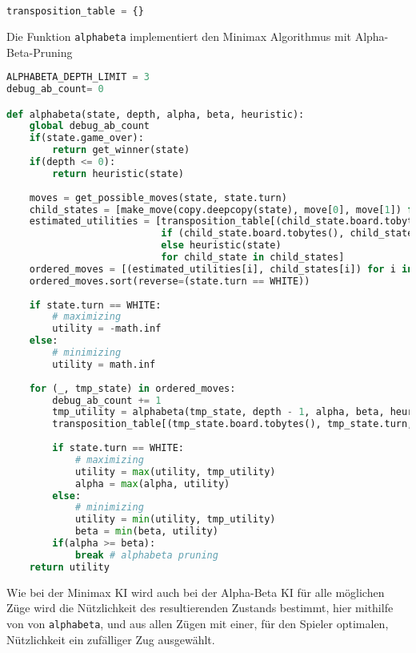 \begin{lstlisting}[language=Python]
transposition_table = {}
\end{lstlisting}

Die Funktion \passthrough{\lstinline!alphabeta!} implementiert den
Minimax Algorithmus mit Alpha-Beta-Pruning

\begin{lstlisting}[language=Python]
ALPHABETA_DEPTH_LIMIT = 3
debug_ab_count= 0

def alphabeta(state, depth, alpha, beta, heuristic):
    global debug_ab_count
    if(state.game_over):
        return get_winner(state)
    if(depth <= 0):
        return heuristic(state)
    
    moves = get_possible_moves(state, state.turn)
    child_states = [make_move(copy.deepcopy(state), move[0], move[1]) for move in moves]
    estimated_utilities = [transposition_table[(child_state.board.tobytes(), child_state.turn, heuristic)]
                           if (child_state.board.tobytes(), child_state.turn, heuristic) in transposition_table
                           else heuristic(state)
                           for child_state in child_states]
    ordered_moves = [(estimated_utilities[i], child_states[i]) for i in range(len(moves))]
    ordered_moves.sort(reverse=(state.turn == WHITE))
    
    if state.turn == WHITE:
        # maximizing
        utility = -math.inf
    else:
        # minimizing
        utility = math.inf
        
    for (_, tmp_state) in ordered_moves:
        debug_ab_count += 1
        tmp_utility = alphabeta(tmp_state, depth - 1, alpha, beta, heuristic)
        transposition_table[(tmp_state.board.tobytes(), tmp_state.turn, heuristic)] = tmp_utility
        
        if state.turn == WHITE:
            # maximizing
            utility = max(utility, tmp_utility)
            alpha = max(alpha, utility)
        else:
            # minimizing
            utility = min(utility, tmp_utility)
            beta = min(beta, utility)
        if(alpha >= beta):
            break # alphabeta pruning
    return utility
\end{lstlisting}

Wie bei der Minimax KI wird auch bei der Alpha-Beta KI für alle
möglichen Züge wird die Nützlichkeit des resultierenden Zustands
bestimmt, hier mithilfe von von \passthrough{\lstinline!alphabeta!}, und
aus allen Zügen mit einer, für den Spieler optimalen, Nützlichkeit ein
zufälliger Zug ausgewählt.

